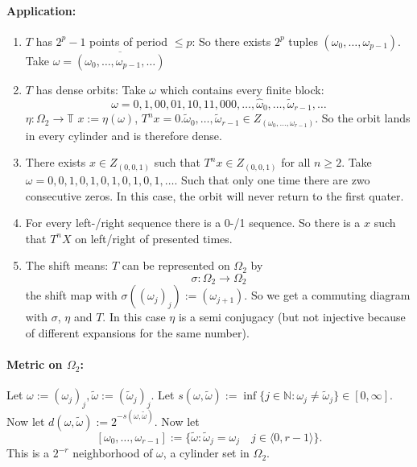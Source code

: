 \documentclass{article}
\newcommand*{\N}{\mathbb{N}}
\newcommand*{\T}{\mathbb{T}}
\newcommand*{\jbr}[1]{{\langle #1 \rangle}}
\begin{document}
\paragraph{Application:}
\begin{enumerate}
    \item $T$ has $2^p-1$ points of period $\leq p$: So there exists $2^p$ tuples $(\omega_0,\dots,\omega_{p-1})$. Take $\omega=\overline{(\omega_0,\dots,\omega_{p-1},\dots)}$

    \item $T$ has dense orbits: Take $\omega$ which contains every finite block:
    $$\omega=0,1,00,01,10,11,000,\dots, \hat \omega_0,\dots,\tilde \omega_{r-1},\dots$$
    $\eta:\Omega_2\to\T$
    $x := \eta(\omega)$, $T^nx=0.\tilde\omega_0,\dots,\tilde\omega_{r-1}\in Z_{(\omega_0,\dots,\omega_{r-1})}$. So the orbit lands in every cylinder and is therefore dense.

    \item There exists $x\in Z_{(0,0,1)}$ such that $T^nx\in Z_{(0,0,1)}$ for all $n\geq 2$. Take $\omega=0,0,1,0,1,0,1,0,1,0,1,\dots$. Such that only one time there are zwo consecutive zeros. In this case, the orbit will never return to the first quater.

    \item For every left-/right sequence there is a 0-/1 sequence. So there is a $x$ such that $T^nX$ on left/right of presented times.

    \item The shift means: $T$ can be represented on $\Omega_2$ by
    $$\sigma:\Omega_2\to \Omega_2$$
    the shift map with $\sigma((\omega_j)_j) := (\omega_{j+1})$. So we get a commuting diagram with $\sigma$, $\eta$ and $T$. In this case $\eta$ is a semi conjugacy (but not injective because of different expansions for the same number).
\end{enumerate}

\paragraph{Metric on $\Omega_2$:}
Let $\omega:=(\omega_j)_j, \tilde \omega:=(\tilde \omega_j)_j$. Let $s(\omega,\tilde\omega):=\inf\{j\in\N:\omega_j\neq\tilde\omega_j\}\in[0,\infty]$. Now let $d(\omega,\tilde\omega):=2^{-s(\omega,\tilde\omega)}$. Now let
$$[\omega_0,\dots,\omega_{r-1}]:=\{\tilde\omega:\tilde\omega_j=\omega_j\quad j \in \jbr{0,r-1}\}.$$
This is a $2^{-r}$ neighborhood of $\omega$, a cylinder set in $\Omega_2$.
\end{document}
